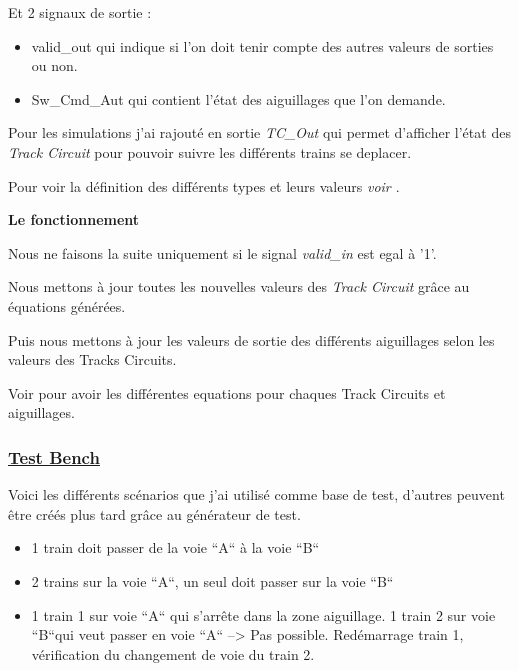 \medskip

Et 2 signaux de sortie :

\begin{itemize}
  \item valid\_out qui indique si l'on doit tenir compte des autres
    valeurs de sorties ou non.
  \item Sw\_Cmd\_Aut qui contient l'état des aiguillages que l'on demande.
\end{itemize}  

\medskip

Pour les simulations j'ai rajouté en sortie \emph{TC\_Out} qui permet
d'afficher l'état des \emph{Track Circuit} pour pouvoir suivre les
différents trains se deplacer. 

Pour voir la définition des différents types et leurs valeurs \emph{voir \cite{interface}}.

\bigskip

\textbf{Le fonctionnement}

Nous ne faisons la suite uniquement si le signal \emph{valid\_in} est egal à '1'.

Nous mettons à jour toutes les nouvelles valeurs des \emph{Track
  Circuit} grâce au équations générées.

Puis nous mettons à jour les valeurs de sortie des différents
aiguillages selon les valeurs des Tracks Circuits.

\smallskip

Voir \cite{interface} pour avoir les différentes equations pour chaques Track
Circuits et aiguillages.

\subsubsection{\underline{Test Bench}}
\label{sec:Test_Bench}

Voici les différents scénarios que j'ai utilisé comme base de test,
d'autres peuvent être créés plus tard grâce au générateur de test.

\medskip

\begin{itemize}
    \item 1 train doit passer de la voie ``A`` à la voie ``B``
    \item 2 trains sur la voie ``A``, un seul doit passer sur la voie ``B``
    \item 1 train 1 sur voie ``A`` qui s'arrête dans la zone aiguillage.
          1 train 2 sur voie ``B``qui veut passer en voie ``A`` --> Pas
          possible. Red\'emarrage train 1, v\'erification du
          changement  de voie du train 2.
\end{itemize}

